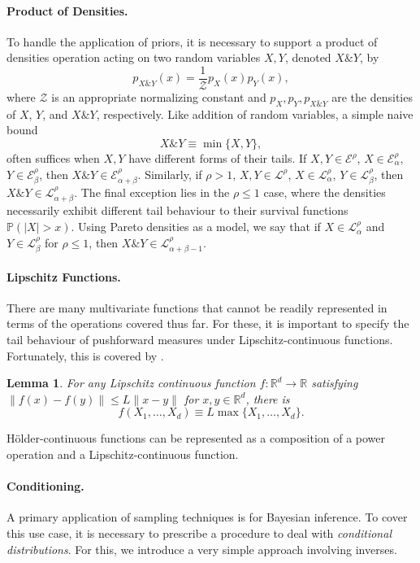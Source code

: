 \documentclass{article}
\newtheorem{lemma}[theorem]{Lemma}
\theoremstyle{definition}
\begin{document}
\paragraph{Product of Densities.}

To handle the application of priors, it is necessary to support a product of densities operation acting on two random variables $X,Y$, denoted $X \& Y$, by
\[
p_{X \& Y}(x) = \frac{1}{\mathcal{Z}} p_X(x) p_Y(x),
\]
where $\mathcal{Z}$ is an appropriate normalizing constant and $p_X,p_Y,p_{X\& Y}$ are the densities of $X$, $Y$, and $X \& Y$, respectively.
Like addition of random variables, a simple naive bound
\[
X \& Y \equiv \min\{X, Y\},
\]
often suffices when $X,Y$ have different forms of their tails. If $X,Y \in \mathcal{E}^\rho$, $X \in \mathcal{E}_\alpha^\rho$, $Y \in \mathcal{E}_\beta^\rho$, then $X\& Y \in \mathcal{E}_{\alpha+\beta}^\rho$. Similarly, if $\rho > 1$, $X,Y \in \mathcal{L}^\rho$, $X \in \mathcal{L}_\alpha^\rho$, $Y \in \mathcal{L}_\beta^\rho$, then $X\& Y \in \mathcal{L}_{\alpha+\beta}^\rho$. The final exception lies in the $\rho \leq 1$ case, where the densities necessarily exhibit different tail behaviour to their survival functions $\mathbb{P}(|X| > x)$. Using Pareto densities as a model, we say that if $X \in \mathcal{L}_\alpha^\rho$ and $Y \in \mathcal{L}_\beta^\rho$ for $\rho \leq 1$, then $X \& Y \in \mathcal{L}_{\alpha+\beta-1}^\rho$.



\paragraph{Lipschitz Functions.}

There are many multivariate functions that cannot be readily represented in terms of the operations covered thus far. For these, it is important to specify the tail behaviour of pushforward measures under Lipschitz-continuous functions. Fortunately, this is covered by \cite[Proposition 1.3]{ledoux2001concentration}.
\begin{lemma}
For any Lipschitz continuous function $f:\mathbb{R}^d \to \mathbb{R}$ satisfying $\|f(x)-f(y)\|\leq L\|x -y\|$ for $x,y \in \mathbb{R}^d$, there is
\[
f(X_1,\dots,X_d) \equiv L \max\{X_1,\dots,X_d\}.
\]
\end{lemma}
H\"{o}lder-continuous functions can be represented as a composition of a power operation and a Lipschitz-continuous function. 

\paragraph{Conditioning.}
A primary application of sampling techniques is for Bayesian inference. To cover this use case, it is necessary to prescribe a procedure to deal with \emph{conditional distributions}. For this, we introduce a very simple approach involving inverses. 
\end{document}

